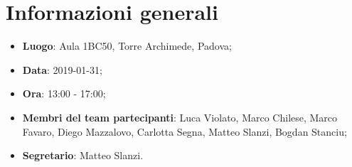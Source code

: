 \section{Informazioni generali}

\begin{itemize}
	\item \textbf{Luogo}: Aula 1BC50, Torre Archimede, Padova; 
	\item \textbf{Data}: 2019-01-31; 
	\item \textbf{Ora}: 13:00 - 17:00; 
	\item \textbf{Membri del team partecipanti}: Luca Violato, Marco Chilese, Marco Favaro, Diego Mazzalovo, Carlotta Segna, Matteo Slanzi, Bogdan Stanciu; 
	\item \textbf{Segretario}: Matteo Slanzi. 
\end{itemize}